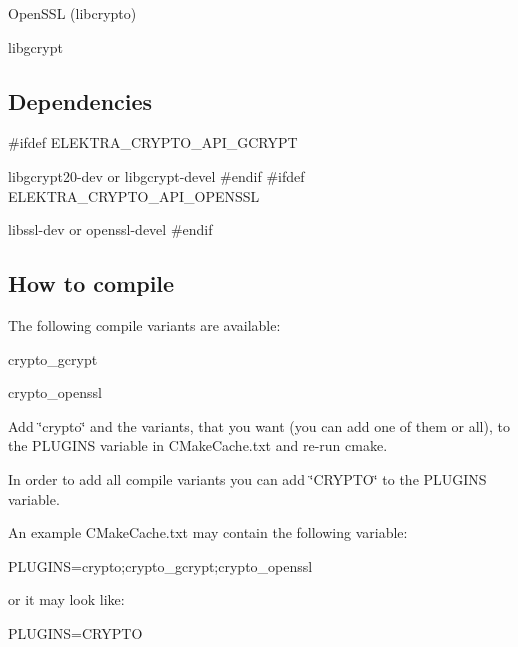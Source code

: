 \begin{DoxyItemize}
\item Open\+S\+S\+L (libcrypto)
\item libgcrypt
\end{DoxyItemize}

\subsection*{Dependencies}

\#ifdef E\+L\+E\+K\+T\+R\+A\+\_\+\+C\+R\+Y\+P\+T\+O\+\_\+\+A\+P\+I\+\_\+\+G\+C\+R\+Y\+P\+T
\begin{DoxyItemize}
\item {\ttfamily libgcrypt20-\/dev} or {\ttfamily libgcrypt-\/devel} \#endif \#ifdef E\+L\+E\+K\+T\+R\+A\+\_\+\+C\+R\+Y\+P\+T\+O\+\_\+\+A\+P\+I\+\_\+\+O\+P\+E\+N\+S\+S\+L
\item {\ttfamily libssl-\/dev} or {\ttfamily openssl-\/devel} \#endif
\end{DoxyItemize}

\subsection*{How to compile}

The following compile variants are available\+:


\begin{DoxyEnumerate}
\item crypto\+\_\+gcrypt
\item crypto\+\_\+openssl
\end{DoxyEnumerate}

Add \char`\"{}crypto\char`\"{} and the variants, that you want (you can add one of them or all), to the {\ttfamily P\+L\+U\+G\+I\+N\+S} variable in {\ttfamily C\+Make\+Cache.\+txt} and re-\/run {\ttfamily cmake}.

In order to add all compile variants you can add \char`\"{}\+C\+R\+Y\+P\+T\+O\char`\"{} to the {\ttfamily P\+L\+U\+G\+I\+N\+S} variable.

An example {\ttfamily C\+Make\+Cache.\+txt} may contain the following variable\+: \begin{DoxyVerb}PLUGINS=crypto;crypto_gcrypt;crypto_openssl
\end{DoxyVerb}


or it may look like\+: \begin{DoxyVerb}PLUGINS=CRYPTO
\end{DoxyVerb}


